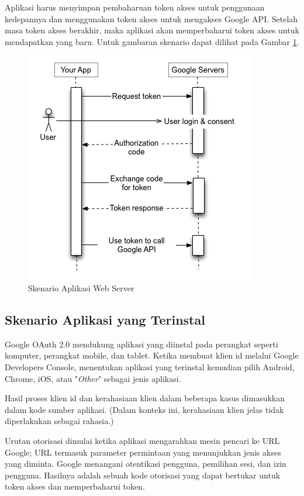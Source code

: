 Aplikasi harus menyimpan pembaharuan token akses untuk penggunaan kedepannya dan menggunakan token akses untuk mengakses Google API. Setelah masa token akses berakhir, maka aplikasi akan memperbaharui token akses untuk mendapatkan yang baru. Untuk gambaran skenario dapat dilihat pada Gambar \ref{fig:skenarioaplikasiwebserver}.

\begin{figure}[H]
\centering
\includegraphics[scale=1]{Gambar/skenario1.png}
\caption[Gambar Skenario Aplikasi Web Server]{Skenario Aplikasi Web Server} 
\label{fig:skenarioaplikasiwebserver}
\end{figure}

\subsection{Skenario Aplikasi yang Terinstal}
Google OAuth 2.0 mendukung aplikasi yang diinstal pada perangkat seperti komputer, perangkat mobile, dan tablet. Ketika membuat klien id melalui Google Developers Console, menentukan aplikasi yang terinstal kemudian pilih Android, Chrome, iOS, atau "{\it Other}" sebagai jenis aplikasi.

Hasil proses klien id dan kerahasiaan klien dalam beberapa kasus dimasukkan dalam kode sumber aplikasi. (Dalam konteks ini, kerahasiaan klien jelas tidak diperlakukan sebagai rahasia.)

Urutan otorisasi dimulai ketika aplikasi mengarahkan mesin pencari ke URL Google; URL termasuk parameter permintaan yang menunjukkan jenis akses yang diminta. Google menangani otentikasi pengguna, pemilihan sesi, dan izin pengguna. Hasilnya adalah sebuah kode otorisasi yang dapat bertukar untuk token akses dan memperbaharui token.

